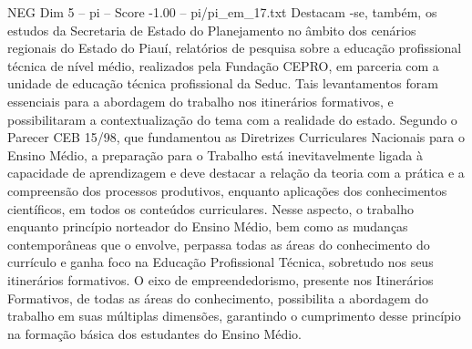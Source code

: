 \begin{textsample}{NEG Dim 5 – pi – Score -1.00 – pi/pi\_em\_17.txt}
Destacam -se, também, os estudos da Secretaria de Estado do Planejamento no âmbito dos cenários regionais do Estado do Piauí, relatórios de pesquisa sobre a educação profissional técnica de nível médio, realizados pela Fundação CEPRO, em parceria com a unidade de educação técnica profissional da Seduc.
Tais levantamentos foram essenciais para a abordagem do trabalho nos itinerários formativos, e possibilitaram a contextualização do tema com a realidade do estado.
Segundo o Parecer CEB 15/98, que fundamentou as Diretrizes Curriculares Nacionais para o Ensino Médio, a preparação para o Trabalho está inevitavelmente ligada à capacidade de aprendizagem e deve destacar a relação da teoria com a prática e a compreensão dos processos produtivos, enquanto aplicações dos conhecimentos científicos, em todos os conteúdos curriculares.
Nesse aspecto, o trabalho enquanto princípio norteador do Ensino Médio, bem como as mudanças contemporâneas que o envolve, perpassa todas as áreas do conhecimento do currículo e ganha foco na Educação Profissional Técnica, sobretudo nos seus itinerários formativos.
O eixo de empreendedorismo, presente nos Itinerários Formativos, de todas as áreas do conhecimento, possibilita a abordagem do trabalho em suas múltiplas dimensões, garantindo o cumprimento desse princípio na formação básica dos estudantes do Ensino Médio.

\end{textsample}
